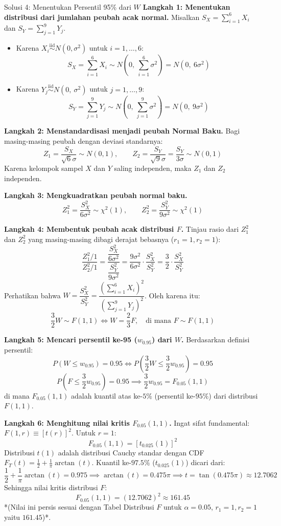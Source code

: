 \documentclass[10pt,twoside]{article}
\begin{document}
\begin{solbox}{Solusi 4: Menentukan Persentil 95\% dari $W$}
\textbf{Langkah 1: Menentukan distribusi dari jumlahan peubah acak normal.}
Misalkan $S_X = \sum_{i=1}^6 X_i$ dan $S_Y = \sum_{j=1}^9 Y_j$.
\begin{itemize}
  \item Karena $X_i \overset{\mathrm{iid}}{\sim} N(0, \sigma^2)$ untuk $i = 1, \dots, 6$:
  \[
  S_X = \sum_{i=1}^6 X_i \sim N\left(0, \ \sum_{i=1}^6 \sigma^2\right) = N(0, \ 6\sigma^2)
  \]
  \item Karena $Y_j \overset{\mathrm{iid}}{\sim} N(0, \ \sigma^2)$ untuk $j = 1, \dots, 9$:
  \[
  S_Y = \sum_{j=1}^9 Y_j \sim N\left(0, \ \sum_{j=1}^9 \sigma^2\right) = N(0, \ 9\sigma^2)
  \]
\end{itemize}

\textbf{Langkah 2: Menstandardisasi menjadi peubah Normal Baku.}
Bagi masing-masing peubah dengan deviasi standarnya:
\[
Z_1 = \frac{S_X}{\sqrt{6}\sigma} \sim N(0, 1), \qquad Z_2 = \frac{S_Y}{\sqrt{9}\sigma} = \frac{S_Y}{3\sigma} \sim N(0, 1)
\]
Karena kelompok sampel $X$ dan $Y$ saling independen, maka $Z_1$ dan $Z_2$ independen.

\textbf{Langkah 3: Mengkuadratkan peubah normal baku.}
\[
Z_1^2 = \frac{S_X^2}{6\sigma^2} \sim \chi^2(1), \qquad Z_2^2 = \frac{S_Y^2}{9\sigma^2} \sim \chi^2(1)
\]

\textbf{Langkah 4: Membentuk peubah acak distribusi $F$.}
Tinjau rasio dari $Z_1^2$ dan $Z_2^2$ yang masing-masing dibagi derajat bebasnya ($r_1 = 1, r_2 = 1$):
\[
\frac{Z_1^2 / 1}{Z_2^2 / 1} = \frac{\dfrac{S_X^2}{6\sigma^2}}{\dfrac{S_Y^2}{9\sigma^2}} = \frac{9\sigma^2}{6\sigma^2} \cdot \frac{S_X^2}{S_Y^2} = \frac{3}{2} \cdot \frac{S_X^2}{S_Y^2}
\]
Perhatikan bahwa $W = \dfrac{S_X^2}{S_Y^2} = \dfrac{\left(\sum_{i=1}^6 X_i\right)^2}{\left(\sum_{j=1}^9 Y_j\right)^2}$. Oleh karena itu:
\[
\frac{3}{2} W \sim F(1, 1) \iff W = \frac{2}{3} F, \quad \text{di mana } F \sim F(1, 1)
\]

\textbf{Langkah 5: Mencari persentil ke-95 ($w_{0.95}$) dari $W$.}
Berdasarkan definisi persentil:
\[
P(W \le w_{0.95}) = 0.95 \iff P\left(\frac{3}{2} W \le \frac{3}{2} w_{0.95}\right) = 0.95
\]
\[
P\left(F \le \frac{3}{2} w_{0.95}\right) = 0.95 \implies \frac{3}{2} w_{0.95} = F_{0.05}(1, 1)
\]
di mana $F_{0.05}(1, 1)$ adalah kuantil atas ke-$5\%$ (persentil ke-$95\%$) dari distribusi $F(1, 1)$.

\textbf{Langkah 6: Menghitung nilai kritis $F_{0.05}(1, 1)$.}
Ingat sifat fundamental: $F(1, r) \equiv [t(r)]^2$. Untuk $r = 1$:
\[
F_{0.05}(1, 1) = \left[t_{0.025}(1)\right]^2
\]
Distribusi $t(1)$ adalah distribusi Cauchy standar dengan CDF $F_T(t) = \frac{1}{2} + \frac{1}{\pi}\arctan(t)$.
Kuantil ke-$97.5\%$ ($t_{0.025}(1)$) dicari dari:
\[
\frac{1}{2} + \frac{1}{\pi}\arctan(t) = 0.975 \implies \arctan(t) = 0.475\pi \implies t = \tan(0.475\pi) \approx 12.7062
\]
Sehingga nilai kritis distribusi $F$:
\[
F_{0.05}(1, 1) = (12.7062)^2 \approx 161.45
\]
*(Nilai ini persis sesuai dengan Tabel Distribusi $F$ untuk $\alpha = 0.05$, $r_1 = 1, r_2 = 1$ yaitu $161.45$)*.


\end{solbox}
\end{document}
